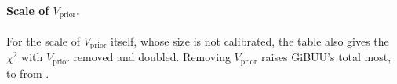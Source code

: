 \paragraph{Scale of $V_{\mathrm{prior}}$.} For the scale of $V_{\mathrm{prior}}$ itself, whose size is not calibrated, the table also gives the $\chi^2$ with $V_{\mathrm{prior}}$ removed and doubled. Removing $V_{\mathrm{prior}}$ raises GiBUU's total most, to  from .

